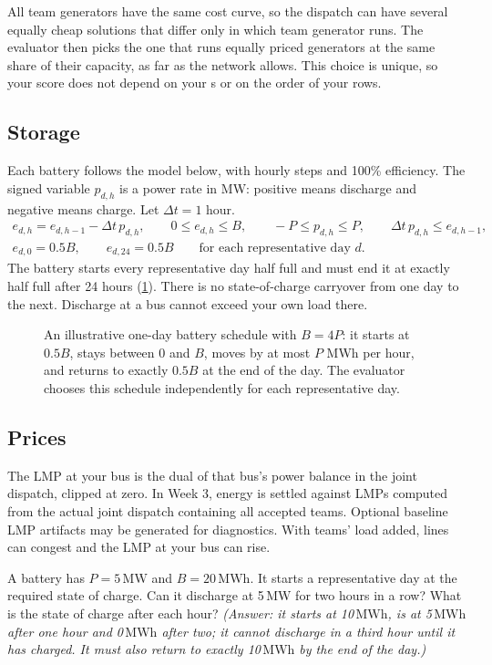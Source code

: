 \documentclass[10pt]{article}
\newcommand{\code}[1]{\path{#1}}
\newcommand{\MW}{\ensuremath{\,\mathrm{MW}}}
\newcommand{\MWh}{\ensuremath{\,\mathrm{MWh}}}
\begin{document}
All team generators have the same cost curve, so the dispatch can have
several equally cheap solutions that differ only in which team generator runs.
The evaluator then picks the one that runs equally priced generators at the
same share of their capacity, as far as the network allows. This choice is
unique, so your score does not depend on your \code{site_id}s or on the order
of your rows.

\subsection{Storage}
Each battery follows the model below, with hourly steps and 100\% efficiency.
The signed variable $p_{d,h}$ is a power rate in MW: positive means discharge
and negative means charge. Let $\Delta t=1$ hour.
\begin{gather*}
  e_{d,h} = e_{d,h-1} - \Delta t\,p_{d,h}, \qquad 0 \le e_{d,h} \le B, \qquad -P \le p_{d,h} \le P, \qquad \Delta t\,p_{d,h} \le e_{d,h-1},\\
  e_{d,0} = 0.5B, \qquad e_{d,24} = 0.5B \qquad \text{for each representative day }d.
\end{gather*}
The battery starts every representative day half full and must end it at
exactly half full after 24 hours (\cref{fig:soc}). There is no state-of-charge
carryover from one day to the next. Discharge at a bus cannot exceed your own
load there.

\begin{figure}[htbp]
  \centering
  
  \caption{An illustrative one-day battery schedule with $B = 4P$: it starts
  at $0.5B$, stays between $0$ and $B$, moves by at most $P$ MWh per hour, and
  returns to exactly $0.5B$ at the end of the day. The evaluator chooses this
  schedule independently for each representative day.}
  \label{fig:soc}
\end{figure}

\subsection{Prices}
The LMP at your bus is the dual of that bus's power balance in the joint
dispatch, clipped at zero. In Week 3, energy is settled against LMPs computed
from the actual joint dispatch containing all accepted teams. Optional baseline LMP artifacts may be generated for
diagnostics. With teams' load added,
lines can congest and the LMP at your bus can rise.

\begin{exercisebox}
A battery has $P = 5\MW$ and $B = 20\MWh$. It starts a representative day at
the required state of charge. Can it discharge at 5\MW{} for two hours in a
row? What is the state of charge after each hour? \emph{(Answer: it starts at
10\MWh, is at 5\MWh{} after one hour and 0\MWh{} after two; it cannot
discharge in a third hour until it has charged. It must also return to exactly
10\MWh{} by the end of the day.)}
\end{exercisebox}
\end{document}
